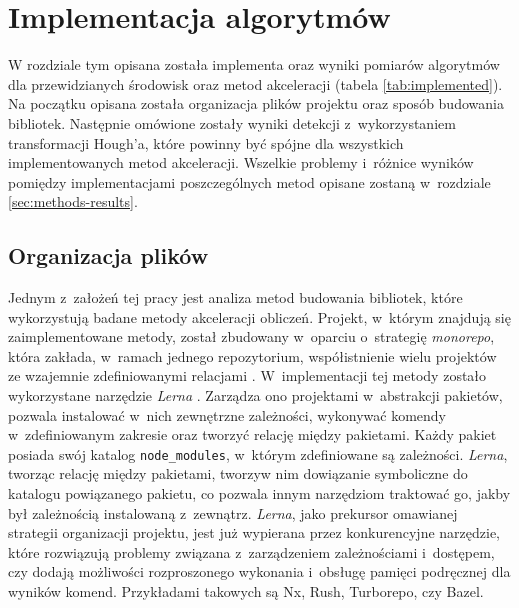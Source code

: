\chapter{Implementacja algorytmów}
\label{sec:implementation}

W rozdziale tym opisana została implementa oraz wyniki pomiarów algorytmów dla przewidzianych środowisk oraz metod akceleracji (tabela \ref{tab:implemented}). Na początku opisana została organizacja plików projektu oraz sposób budowania bibliotek. Następnie omówione zostały wyniki detekcji z~wykorzystaniem transformacji Hough'a, które powinny być spójne dla wszystkich implementowanych metod akceleracji. Wszelkie problemy i~różnice wyników pomiędzy implementacjami poszczególnych metod opisane zostaną w~rozdziale \ref{sec:methods-results}. 



\section{Organizacja plików}

Jednym z~założeń tej pracy jest analiza metod budowania bibliotek, które wykorzystują badane metody akceleracji obliczeń. Projekt, w~którym znajdują się zaimplementowane metody, został zbudowany w~oparciu o~strategię \textit{monorepo}, która zakłada, w~ramach jednego repozytorium, współistnienie wielu projektów ze wzajemnie zdefiniowanymi relacjami \cite{monorepo}. W~implementacji tej metody zostało wykorzystane narzędzie \textit{Lerna} \cite{lerna}. Zarządza ono projektami w~abstrakcji pakietów, pozwala instalować w~nich zewnętrzne zależności, wykonywać komendy w~zdefiniowanym zakresie oraz tworzyć relację między pakietami. Każdy pakiet posiada swój katalog \lstinline{node_modules}, w~którym zdefiniowane są zależności. \textit{Lerna}, tworząc relację między pakietami, tworzyw nim dowiązanie symboliczne do katalogu powiązanego pakietu, co pozwala innym narzędziom traktować go, jakby był zależnością instalowaną z~zewnątrz. \textit{Lerna}, jako prekursor omawianej strategii organizacji projektu, jest już wypierana przez konkurencyjne narzędzie, które rozwiązują problemy związana z~zarządzeniem zależnościami i~dostępem, czy dodają możliwości rozproszonego wykonania i~obsługę pamięci podręcznej dla wyników komend. Przykładami takowych są Nx, Rush, Turborepo, czy Bazel.

